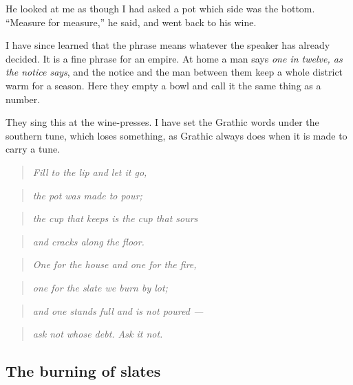 \documentclass{design/chronicle}
\begin{document}
He looked at me as though I had asked a pot which side was the bottom. “Measure for measure,” he said, and went back to his wine.

I have since learned that the phrase means whatever the speaker has already decided. It is a fine phrase for an empire. At home a man says \emph{one in twelve, as the notice says}, and the notice and the man between them keep a whole district warm for a season. Here they empty a bowl and call it the same thing as a number.

They sing this at the wine-presses. I have set the Grathic words under the southern tune, which loses something, as Grathic always does when it is made to carry a tune.

\begin{quote}\itshape Fill to the lip and let it go,\end{quote}

\begin{quote}\itshape the pot was made to pour;\end{quote}

\begin{quote}\itshape the cup that keeps is the cup that sours\end{quote}

\begin{quote}\itshape and cracks along the floor.\end{quote}

\begin{quote}\itshape \end{quote}

\begin{quote}\itshape One for the house and one for the fire,\end{quote}

\begin{quote}\itshape one for the slate we burn by lot;\end{quote}

\begin{quote}\itshape and one stands full and is not poured ---\end{quote}

\begin{quote}\itshape ask not whose debt. Ask it not.\end{quote}

\subsection*{The burning of slates}
\end{document}
